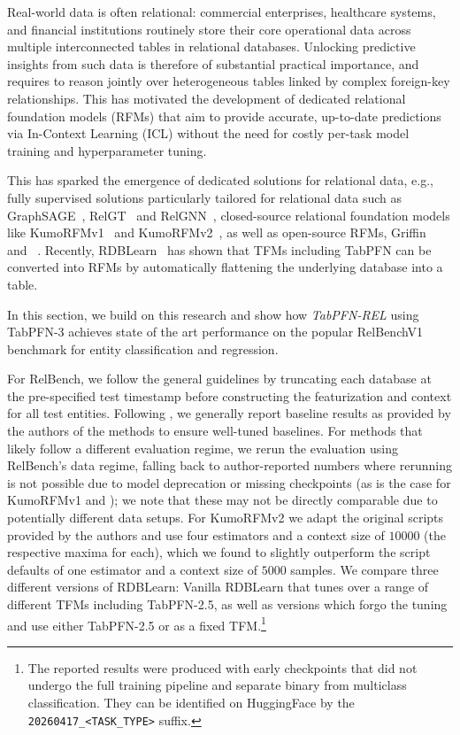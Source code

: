Real-world data is often relational: commercial enterprises, healthcare systems, and financial institutions routinely store their core operational data across multiple interconnected tables in relational databases. Unlocking predictive insights from such data is therefore of substantial practical importance, and requires to reason jointly over heterogeneous tables linked by complex foreign-key relationships. This has motivated the development of dedicated relational foundation models (RFMs) that aim to provide accurate, up-to-date predictions via In-Context Learning (ICL) without the need for costly per-task model training and hyperparameter tuning.

This has sparked the emergence of dedicated solutions for relational data, e.g., fully supervised solutions particularly tailored for relational data such as GraphSAGE~\cite{graphsage}, RelGT~\cite{relgt} and RelGNN~\cite{relgnn}, closed-source relational foundation models like KumoRFMv1~\cite{kumorfmv1} and KumoRFMv2~\cite{kumorfmv2}, as well as open-source RFMs, Griffin~\cite{griffin} and \rtzero~\cite{rt_zero}. Recently, RDBLearn~\cite{rdblearn} has shown that TFMs including TabPFN can be converted into RFMs by automatically flattening the underlying database into a table.

In this section, we build on this research and show how \emph{TabPFN-REL} using TabPFN-3 achieves state of the art performance on the popular RelBenchV1~\cite{relbenchv1} benchmark for entity classification and regression. 

For RelBench, we follow the general guidelines by truncating each database at the pre-specified test timestamp before constructing the featurization and context for all test entities. Following \citet{kumorfmv2}, we generally report baseline results as provided by the authors of the methods to ensure well-tuned baselines. For methods that likely follow a different evaluation regime, we rerun the evaluation using RelBench's data regime, falling back to author-reported numbers where rerunning is not possible due to model deprecation or missing checkpoints (as is the case for KumoRFMv1 and \rtzero); we note that these may not be directly comparable due to potentially different data setups. For KumoRFMv2 we adapt the original scripts provided by the authors and use four estimators and a context size of $10000$ (the respective maxima for each), which we found to slightly outperform the script defaults of one estimator and a context size of $5000$ samples. We compare three different versions of RDBLearn: Vanilla RDBLearn that tunes over a range of different TFMs including TabPFN-2.5, as well as versions which forgo the tuning and use either TabPFN-2.5 or \ourmodel as a fixed TFM.\footnote{The reported results were produced with early checkpoints that did not undergo the full training pipeline and separate binary from multiclass classification. They can be identified on HuggingFace by the \texttt{20260417\_\textless TASK\_TYPE\textgreater} suffix.}

